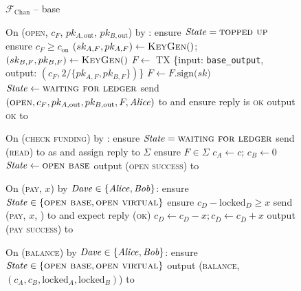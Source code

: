 \begin{figure}[H]
  \begin{systembox}{$\mathcal{F}_{\mathrm{Chan}}$ -- base}
    \begin{algorithmic}[1]
      \State On (\textsc{open}, $c_F$, $pk_{A, \mathrm{out}}$, $pk_{B,
      \mathrm{out}}$) by \alice:
      \Indent
        \State ensure $\mathit{State} = \textsc{topped up}$
        \State ensure $c_F \geq c_{\mathrm{on}}$
        \State $(sk_{A, F}, pk_{A, F}) \gets \textsc{KeyGen}()$; $(sk_{B, F},
        pk_{B, F}) \gets \textsc{KeyGen}()$
        \State $F \gets$ TX \{input: \texttt{base\_output}, output: $(c_F,
        2/\{pk_{A, F}, pk_{B, F}\})$\}
        \State $F \gets F\mathrm{.sign(}sk\mathrm{)}$
        \State $\mathit{State} \gets \textsc{waiting for ledger}$
        \State send $(\textsc{open}, c_F, pk_{A, \mathrm{out}}, pk_{B,
        \mathrm{out}}, F, \mathit{Alice})$ to \adversary and ensure reply is \textsc{ok}
        \State output \textsc{ok} to \alice
      \EndIndent
      \Statex

      \State On (\textsc{check funding}) by \alice:
      \Indent
        \State ensure $\mathit{State} = \textsc{waiting for ledger}$
        \State send (\textsc{read}) to \ledger as \alice and assign reply to
        $\Sigma$
        \State ensure $F \in \Sigma$
        \State $c_A \gets c$; $c_B \gets 0$
        \State $\mathit{State} \gets \textsc{open base}$
        \State output (\textsc{open success}) to \alice
      \EndIndent
      \Statex

      \State On (\textsc{pay}, $x$) by $\mathit{Dave} \in \{\mathit{Alice}, \mathit{Bob}\}$:
      \Indent
        \State ensure $\mathit{State} \in \{\textsc{open base}, \textsc{open
        virtual}\}$
        \State ensure $c_D - \mathrm{locked}_D \geq x$
        \State send (\textsc{pay}, $x$, \dave) to \adversary and expect reply
        (\textsc{ok})
        \State $c_D \gets c_D - x; c_{\bar{D}} \gets c_{\bar{D}} + x$
        \State output (\textsc{pay success}) to \dave
      \EndIndent
      \Statex

      \State On (\textsc{balance}) by $\mathit{Dave} \in \{\mathit{Alice}, \mathit{Bob}\}$:
      \Indent
        \State ensure $\mathit{State} \in \{\textsc{open base}, \textsc{open
        virtual}\}$
        \State output (\textsc{balance}, $(c_A, c_B, \mathrm{locked}_A,
        \mathrm{locked}_B)$) to \dave %
      \EndIndent
    \end{algorithmic}
  \end{systembox}
  \caption{}
  \label{code:functionality:chan:skeleton:base}
\end{figure}

